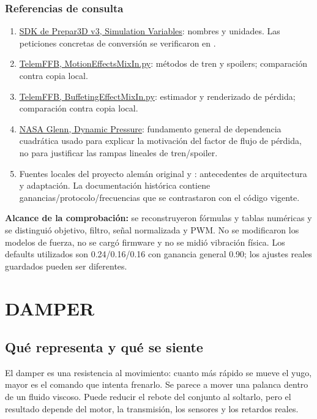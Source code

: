 \documentclass[11pt,a4paper]{article}
\newcommand{\code}[1]{\texttt{\detokenize{#1}}}
\begin{document}
\subsubsection{Referencias de consulta}
\begin{enumerate}
\item \href{https://www.prepar3d.com/SDKv3/LearningCenter/utilities/variables/simulation_variables.html}{SDK de Prepar3D v3, Simulation Variables}: nombres y unidades. Las peticiones concretas de conversión se verificaron en \code{main.cpp}.
\item \href{https://github.com/walmis/VPforce-TelemFFB/blob/refactor/telemffb/sim/base/MotionEffectsMixIn.py}{TelemFFB, MotionEffectsMixIn.py}: métodos de tren y spoilers; comparación contra copia local.
\item \href{https://github.com/walmis/VPforce-TelemFFB/blob/refactor/telemffb/sim/base/BuffetingEffectMixIn.py}{TelemFFB, BuffetingEffectMixIn.py}: estimador y renderizado de pérdida; comparación contra copia local.
\item \href{https://www1.grc.nasa.gov/beginners-guide-to-aeronautics/dynamic-pressure-2/}{NASA Glenn, Dynamic Pressure}: fundamento general de dependencia cuadrática usado para explicar la motivación del factor de flujo de pérdida, no para justificar las rampas lineales de tren/spoiler.
\item Fuentes locales del proyecto alemán original y \code{LEEME md/EFECTOS_SIMCONNECT.md}: antecedentes de arquitectura y adaptación. La documentación histórica contiene ganancias/protocolo/frecuencias que se contrastaron con el código vigente.
\end{enumerate}
\textbf{Alcance de la comprobación:} se reconstruyeron fórmulas y tablas numéricas y se distinguió objetivo, filtro, señal normalizada y PWM. No se modificaron los modelos de fuerza, no se cargó firmware y no se midió vibración física. Los defaults utilizados son 0.24/0.16/0.16 con ganancia general 0.90; los ajustes reales guardados pueden ser diferentes.
\newpage
\section{DAMPER}
\label{sec:damper}

\subsection{Qué representa y qué se siente}
El damper es una resistencia al movimiento: cuanto más rápido se mueve el yugo, mayor es el comando que intenta frenarlo. Se parece a mover una palanca dentro de un fluido viscoso. Puede reducir el rebote del conjunto al soltarlo, pero el resultado depende del motor, la transmisión, los sensores y los retardos reales.
\end{document}
